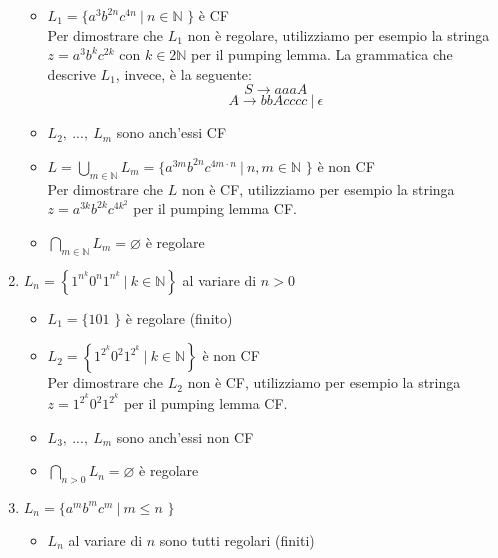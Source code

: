 \documentclass[a4paper,oneside,titlepage]{book}
\begin{document}
\begin{enumerate}[label=\fbox{\arabic*}]
\begin{itemize}
\begin{center}
\end{center}

\item $L_1 = \text{\{ } a^3 b^{2n} c^{4n} \ | \  n \in \mathbb{N} \text{ \}}$ è CF
\\ Per dimostrare che $L_1$ non è regolare, utilizziamo per esempio la stringa $z = a^3 b^k c^{2k}$ con $k \in 2\mathbb{N}$ per il pumping lemma. La grammatica che descrive $L_1$, invece, è la seguente:
\[ S \longrightarrow aaaA \]
\[ A \longrightarrow bbAcccc \ | \ \epsilon \]

\item $L_2, \ ..., \ L_m$ sono anch'essi CF

\item $L = \bigcup_{m \in \mathbb{N}} L_m = \text{\{ } a^{3m} b^{2n} c^{4m \cdot n} \ | \  n,m \in \mathbb{N} \text{ \}}$ è non CF
\\ Per dimostrare che $L$ non è CF, utilizziamo per esempio la stringa $z = a^{3k} b^{2k} c^{4k^2}$ per il pumping lemma CF.

\item $\bigcap_{m \in \mathbb{N}} L_m = \varnothing$ è regolare
\end{itemize}

\item $L_n = \left\lbrace 1^{n^k} 0^n 1^{n^k} \ | \  k \in \mathbb{N} \right\rbrace$ al variare di $n > 0$
\begin{itemize}
\item $L_1 = \text{\{ } 101 \text{ \}}$ è regolare (finito)

\item $L_2 = \left\lbrace 1^{2^k} 0^2 1^{2^k} \ | \  k \in \mathbb{N} \right\rbrace$ è non CF
\\ Per dimostrare che $L_2$ non è CF, utilizziamo per esempio la stringa $z = 1^{2^k} 0^2 1^{2^k}$ per il pumping lemma CF.

\item $L_3, \ ..., \ L_m$ sono anch'essi non CF

\item $\bigcap_{n > 0} L_n = \varnothing$ è regolare
\end{itemize}

\newpage
\item $L_n = \text{\{ } a^m b^m c^m \ | \  m \leq n \text{ \}}$
\begin{itemize}
\item $L_n$ al variare di $n$ sono tutti regolari (finiti)


\end{itemize}
\end{enumerate}
\end{document}
